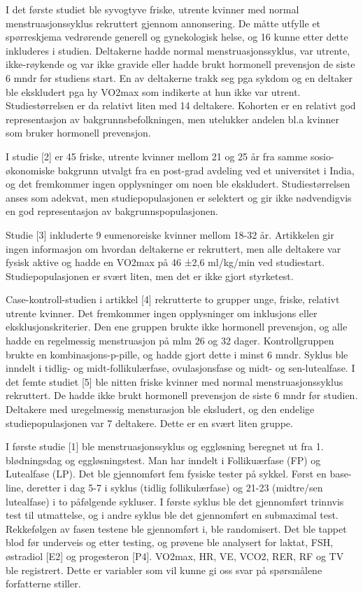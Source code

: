 \documentclass[
  letterpaper,
  DIV=11,
  numbers=noendperiod]{scrreprt}
\begin{document}
I det første studiet ble syvogtyve friske, utrente kvinner med normal
menstruasjonssyklus rekruttert gjennom annonsering. De måtte utfylle et
spørreskjema vedrørende generell og gynekologisk helse, og 16 kunne
etter dette inkluderes i studien. Deltakerne hadde normal
menstruasjonssyklus, var utrente, ikke-røykende og var ikke gravide
eller hadde brukt hormonell prevensjon de siste 6 mndr før studiens
start. En av deltakerne trakk seg pga sykdom og en deltaker ble
ekskludert pga hy VO2max som indikerte at hun ikke var utrent.
Studiestørrelsen er da relativt liten med 14 deltakere. Kohorten er en
relativt god representasjon av bakgrunnsbefolkningen, men utelukker
andelen bl.a kvinner som bruker hormonell prevensjon.

I studie {[}2{]} er 45 friske, utrente kvinner mellom 21 og 25 år fra
samme sosio-økonomiske bakgrunn utvalgt fra en post-grad avdeling ved et
universitet i India, og det fremkommer ingen opplysninger om noen ble
ekskludert. Studiestørrelsen anses som adekvat, men studiepopulasjonen
er selektert og gir ikke nødvendigvis en god representasjon av
bakgrunnspopulasjonen.

Studie {[}3{]} inkluderte 9 eumenoreiske kvinner mellom 18-32 år.
Artikkelen gir ingen informasjon om hvordan deltakerne er rekruttert,
men alle deltakere var fysisk aktive og hadde en VO2max på 46 ±2,6
ml/kg/min ved studiestart. Studiepopulasjonen er svært liten, men det er
ikke gjort styrketest.

Case-kontroll-studien i artikkel {[}4{]} rekrutterte to grupper unge,
friske, relativt utrente kvinner. Det fremkommer ingen opplysninger om
inklusjons eller eksklusjonskriterier. Den ene gruppen brukte ikke
hormonell prevensjon, og alle hadde en regelmessig menstruasjon på mlm
26 og 32 dager. Kontrollgruppen brukte en kombinasjons-p-pille, og hadde
gjort dette i minst 6 mndr. Syklus ble inndelt i tidlig- og
midt-follikulærfase, ovulasjonsfase og midt- og sen-lutealfase. I det
femte studiet {[}5{]} ble nitten friske kvinner med normal
menstruasjonssyklus rekruttert. De hadde ikke brukt hormonell prevensjon
de siste 6 mndr før studien. Deltakere med uregelmessig mensturasjon ble
eksludert, og den endelige studiepopulasjonen var 7 deltakere. Dette er
en svært liten gruppe.

I første studie {[}1{]} ble menstruasjonssyklus og eggløsning beregnet
ut fra 1. blødningsdag og eggløsningstest. Man har inndelt i
Follikuærfase (FP) og Lutealfase (LP). Det ble gjennomført fem fysiske
tester på sykkel. Først en base-line, deretter i dag 5-7 i syklus
(tidlig follikulærfase) og 21-23 (midtre/sen lutealfase) i to påfølgende
sykluser. I første syklus ble det gjennomført trinnvis test til
utmattelse, og i andre syklus ble det gjennomført en submaximal test.
Rekkefølgen av fasen testene ble gjennomført i, ble randomisert. Det ble
tappet blod før underveis og etter testing, og prøvene ble analysert for
laktat, FSH, østradiol {[}E2{]} og progesteron {[}P4{]}. VO2max, HR, VE,
VCO2, RER, RF og TV ble registrert. Dette er variabler som vil kunne gi
oss svar på spørsmålene forfatterne stiller.
\end{document}
